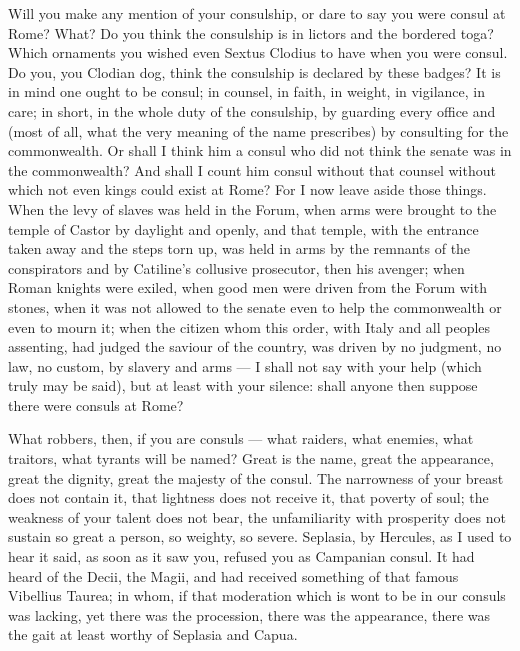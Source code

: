  Will you make any mention of your consulship, or dare to say you were consul at Rome? What? Do you think the consulship is in lictors and the bordered toga? Which ornaments you wished even Sextus Clodius to have when you were consul. Do you, you Clodian dog, think the consulship is declared by these badges? It is in mind one ought to be consul; in counsel, in faith, in weight, in vigilance, in care; in short, in the whole duty of the consulship, by guarding every office and (most of all, what the very meaning of the name prescribes) by consulting for the commonwealth. Or shall I think him a consul who did not think the senate was in the commonwealth? And shall I count him consul without that counsel without which not even kings could exist at Rome? For I now leave aside those things. When the levy of slaves was held in the Forum, when arms were brought to the temple of Castor by daylight and openly, and that temple, with the entrance taken away and the steps torn up, was held in arms by the remnants of the conspirators and by Catiline's collusive prosecutor, then his avenger; when Roman knights were exiled, when good men were driven from the Forum with stones, when it was not allowed to the senate even to help the commonwealth or even to mourn it; when the citizen whom this order, with Italy and all peoples assenting, had judged the saviour of the country, was driven by no judgment, no law, no custom, by slavery and arms — I shall not say with your help (which truly may be said), but at least with your silence: shall anyone then suppose there were consuls at Rome?

 What robbers, then, if you are consuls — what raiders, what enemies, what traitors, what tyrants will be named? Great is the name, great the appearance, great the dignity, great the majesty of the consul. The narrowness of your breast does not contain it, that lightness does not receive it, that poverty of soul; the weakness of your talent does not bear, the unfamiliarity with prosperity does not sustain so great a person, so weighty, so severe. Seplasia, by Hercules, as I used to hear it said, as soon as it saw you, refused you as Campanian consul. It had heard of the Decii, the Magii, and had received something of that famous Vibellius Taurea; in whom, if that moderation which is wont to be in our consuls was lacking, yet there was the procession, there was the appearance, there was the gait at least worthy of Seplasia and Capua.

